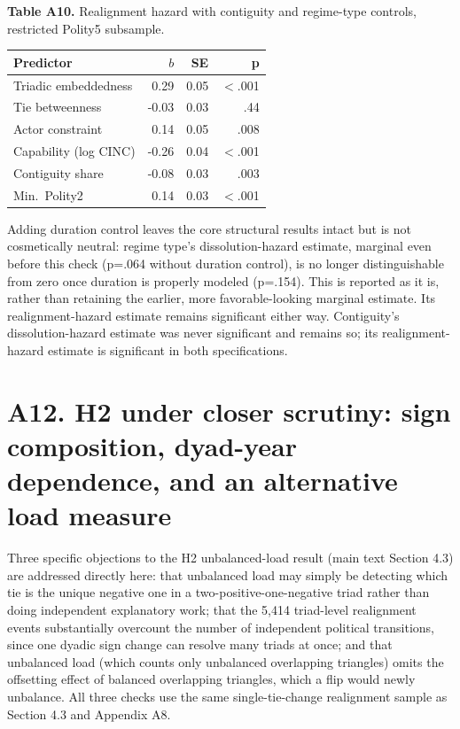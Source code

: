 \documentclass[Afour,sageh,times,doublespace]{sagej}
\begin{document}
\begin{table}[t]
\centering
\textbf{Table A10.} Realignment hazard with contiguity and regime-type controls, restricted Polity5 subsample.

\vspace{4pt}
{\small\sf
\begin{tabular}{lrrr}
\toprule
Predictor & $b$ & SE & p\\
\midrule
Triadic embeddedness & 0.29 & 0.05 & $<$.001\\
Tie betweenness & -0.03 & 0.03 & .44\\
Actor constraint & 0.14 & 0.05 & .008\\
Capability (log CINC) & -0.26 & 0.04 & $<$.001\\
Contiguity share & -0.08 & 0.03 & .003\\
Min.\ Polity2 & 0.14 & 0.03 & $<$.001\\
\bottomrule
\end{tabular}
\par}
\end{table}

Adding duration control leaves the core structural results intact but is not cosmetically neutral: regime type's dissolution-hazard estimate, marginal even before this check (p=.064 without duration control), is no longer distinguishable from zero once duration is properly modeled (p=.154). This is reported as it is, rather than retaining the earlier, more favorable-looking marginal estimate. Its realignment-hazard estimate remains significant either way. Contiguity's dissolution-hazard estimate was never significant and remains so; its realignment-hazard estimate is significant in both specifications.

\section*{A12. H2 under closer scrutiny: sign composition, dyad-year dependence, and an alternative load measure}

Three specific objections to the H2 unbalanced-load result (main text Section 4.3) are addressed directly here: that unbalanced load may simply be detecting which tie is the unique negative one in a two-positive-one-negative triad rather than doing independent explanatory work; that the 5,414 triad-level realignment events substantially overcount the number of independent political transitions, since one dyadic sign change can resolve many triads at once; and that unbalanced load (which counts only unbalanced overlapping triangles) omits the offsetting effect of balanced overlapping triangles, which a flip would newly unbalance. All three checks use the same single-tie-change realignment sample as Section 4.3 and Appendix A8.
\end{document}
